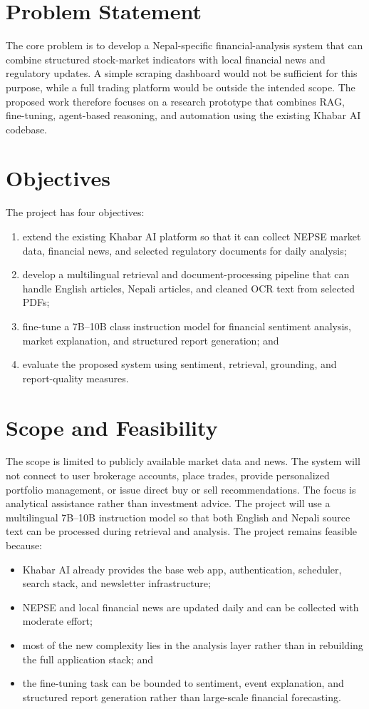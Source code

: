 \documentclass[12pt,a4paper]{report}
\begin{document}
\section{Problem Statement}
The core problem is to develop a Nepal-specific financial-analysis system that can combine structured stock-market indicators with local financial news and regulatory updates. A simple scraping dashboard would not be sufficient for this purpose, while a full trading platform would be outside the intended scope. The proposed work therefore focuses on a research prototype that combines \ac{RAG}, fine-tuning, agent-based reasoning, and automation using the existing Khabar AI codebase.

\section{Objectives}
The project has four objectives:
\begin{enumerate}[leftmargin=1.6em]
    \item extend the existing Khabar AI platform so that it can collect \ac{NEPSE} market data, financial news, and selected regulatory documents for daily analysis;
    \item develop a multilingual retrieval and document-processing pipeline that can handle English articles, Nepali articles, and cleaned OCR text from selected PDFs;
    \item fine-tune a 7B--10B class instruction model for financial sentiment analysis, market explanation, and structured report generation; and
    \item evaluate the proposed system using sentiment, retrieval, grounding, and report-quality measures.
\end{enumerate}

\section{Scope and Feasibility}
The scope is limited to publicly available market data and news. The system will not connect to user brokerage accounts, place trades, provide personalized portfolio management, or issue direct buy or sell recommendations. The focus is analytical assistance rather than investment advice. The project will use a multilingual 7B--10B instruction model so that both English and Nepali source text can be processed during retrieval and analysis. The project remains feasible  because:
\begin{itemize}[leftmargin=1.6em]
    \item Khabar AI already provides the base web app, authentication, scheduler, search stack, and newsletter infrastructure;
    \item \ac{NEPSE} and local financial news are updated daily and can be collected with moderate effort;
    \item most of the new complexity lies in the analysis layer rather than in rebuilding the full application stack; and
    \item the fine-tuning task can be bounded to sentiment, event explanation, and structured report generation rather than large-scale financial forecasting.
\end{itemize}
\end{document}
